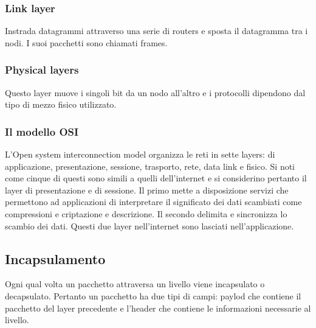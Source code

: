 \subsubsection{Link layer}
Instrada datagrammi attraverso una serie di routers e sposta il datagramma tra i nodi. I suoi pacchetti sono chiamati frames.
\subsubsection{Physical layers}
Questo layer muove i singoli bit da un nodo all'altro e i protocolli dipendono dal tipo di mezzo fisico utilizzato.
\subsubsection{Il modello OSI}
L'Open system interconnection model organizza le reti in sette layers: di applicazione, presentazione, sessione, trasporto, rete, data link e fisico. Si noti come cinque di questi sono simili a quelli dell'internet
e si considerino pertanto il layer di presentazione e di sessione. Il primo mette a disposizione servizi che permettono ad applicazioni di interpretare il significato dei dati scambiati come compressioni e 
criptazione e descrizione. Il secondo delimita e sincronizza lo scambio dei dati. Questi due layer nell'internet sono lasciati nell'applicazione. 
\subsection{Incapsulamento}
Ogni qual volta un pacchetto attraversa un livello viene incapsulato o decapsulato. Pertanto un pacchetto ha due tipi di campi: paylod che contiene il pacchetto del layer precedente e l'header che contiene le 
informazioni necessarie al livello. 
